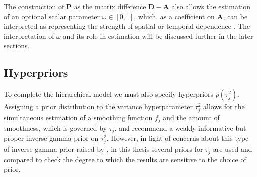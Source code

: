 The construction of $\mathbf{P}$ as the matrix difference $\mathbf{D} - \mathbf{A}$ also allows the estimation of an optional scalar parameter $\omega \in [0,1]$, which, as a coefficient on $\mathbf{A}$, can be interpreted as representing the strength of spatial or temporal dependence . The interpretation of $\omega$ and its role in estimation will be discussed further in the later sections. 


\subsection{Hyperpriors}

To complete the hierarchical model we must also specify hyperpriors $p(\tau_j^2)$.  Assigning a prior distribution to the variance hyperparameter $\tau_j^2$ allows for the simultaneous estimation of a smoothing function $f_j$ and the amount of smoothness, which is governed by $\tau_j$.   and  recommend a weakly informative but proper inverse-gamma prior on $\tau_j^2$. However, in light of concerns about this type of inverse-gamma prior raised by , in this thesis several priors for $\tau_j$ are used and compared to check the degree to which the results are sensitive to the choice of prior.

